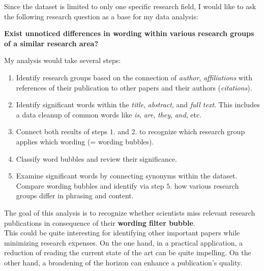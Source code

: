 \begin{homeworkProblem}
  Since the dataset is limited to only one specific research field, I would like to ask the following research question as a base for my data analysis:\\

\begin{center}\textbf{Exist unnoticed differences in wording within various research groups of a similar research area?}\\
\end{center}


  My analysis would take several steps:
  \begin{enumerate}
    \item Identify research groups based on the connection of \emph{author}, \emph{affiliations} with references of their publication to other papers and their authors (\emph{citations}).
    \item Identify significant words within the \emph{title}, \emph{abstract}, and \emph{full text}. This includes a data cleanup of common words like \textit{is}, \textit{are}, \textit{they}, \textit{and}, etc.
    \item Connect both results of steps $1.$ and $2.$ to recognize which research group applies which wording (= wording bubbles).
    \item Classify word bubbles and review their significance.
    \item Examine significant words by connecting synonyms within the dataset.
    Compare wording bubbles and identify via step $5.$ how various research groups differ in phrasing and content.
  \end{enumerate}


  The goal of this analysis is to recognize whether scientists miss relevant research publications in consequence of their \textbf{wording filter bubble}.\\

  This could be quite interesting for identifying other important papers while minimizing research expenses. On the one hand, in a practical application, a reduction of reading the current state of the art can be quite impelling. On the other hand, a broadening of the horizon can enhance a publication's quality.
\end{homeworkProblem}


